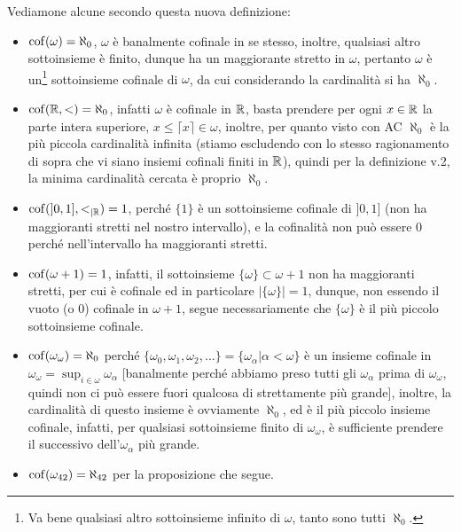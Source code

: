\begin{example}
	Vediamone alcune secondo questa nuova definizione:
	\begin{itemize}
		\item $\operatorname{cof}(\omega) = \aleph_0$, $\omega$ \`e banalmente cofinale in se stesso, inoltre, qualsiasi altro sottoinsieme \`e finito, dunque ha un maggiorante stretto in $\omega$, pertanto $\omega$ \`e un\footnote{Va bene qualsiasi altro sottoinsieme infinito di $\omega$, tanto sono tutti $\aleph_0$.} sottoinsieme
		cofinale di $\omega$, da cui considerando la cardinalit\`a si ha $\aleph_0$.
		\item $\operatorname{cof}(\mathbb R,<) = \aleph_0$, infatti $\omega$ \`e cofinale in $\mathbb R$, basta prendere per ogni $x \in \mathbb R$ la parte intera superiore, $x \leq \lceil x \rceil \in \omega$, inoltre, per quanto visto con AC $\aleph_0$ \`e la pi\`u
		piccola cardinalit\`a infinita (stiamo escludendo con lo stesso ragionamento di sopra che vi siano insiemi cofinali finiti in $\mathbb R$), quindi per la definizione v.2, la minima cardinalit\`a cercata \`e proprio $\aleph_0$.
		\item $\operatorname{cof}(]0,1],<_{|\mathbb R}) = 1$, perch\'e $\{1\}$ \`e un sottoinsieme cofinale di $]0,1]$ (non ha maggioranti stretti nel nostro intervallo), e la cofinalit\`a non pu\`o essere 0 perch\'e nell'intervallo ha maggioranti stretti.
		\item $\operatorname{cof}(\omega+1) = 1$, infatti, il sottoinsieme $\{\omega\} \subset \omega + 1$ non ha maggioranti stretti, per cui \`e cofinale ed in particolare $|\{\omega\}| = 1$, dunque, non essendo il vuoto (o 0) cofinale in $\omega + 1$, segue necessariamente che $\{\omega\}$ \`e il pi\`u piccolo sottoinsieme cofinale.
		\item $\operatorname{cof}(\omega_\omega) = \aleph_0$ perch\'e $\{\omega_0,\omega_1,\omega_2,\ldots\} = \{\omega_\alpha | \alpha < \omega\}$ \`e un insieme cofinale in $\omega_\omega = \sup_{i \in \omega} \omega_\alpha$ [banalmente perch\'e abbiamo preso tutti gli $\omega_\alpha$ prima di $\omega_\omega$, quindi non ci pu\`o essere fuori qualcosa di strettamente pi\`u grande], inoltre, la cardinalit\`a di questo insieme \`e ovviamente $\aleph_0$,
		ed \`e il pi\`u piccolo insieme cofinale, infatti, per qualsiasi sottoinsieme finito di $\omega_\omega$, \`e sufficiente prendere il successivo dell'$\omega_\alpha$ pi\`u grande.
		\item $\operatorname{cof}(\omega_{42}) = \aleph_{42}$ per la proposizione che segue.
	\end{itemize}
\end{example}

